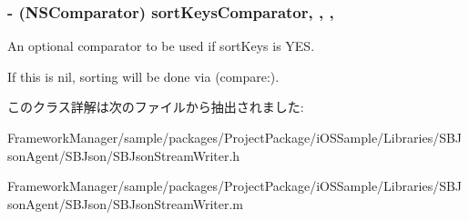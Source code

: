 \subsubsection[{sort\+Keys\+Comparator}]{\setlength{\rightskip}{0pt plus 5cm}-\/ (N\+S\+Comparator) sort\+Keys\+Comparator\hspace{0.3cm}{\ttfamily [read]}, {\ttfamily [write]}, {\ttfamily [atomic]}, {\ttfamily [copy]}}\label{interface_s_b_json_stream_writer_a4a23ef91623a82c08a1597937b7c4f3b}


An optional comparator to be used if sort\+Keys is Y\+E\+S. 

If this is nil, sorting will be done via (compare\+:). 

このクラス詳解は次のファイルから抽出されました\+:\begin{DoxyCompactItemize}
\item 
Framework\+Manager/sample/packages/\+Project\+Package/i\+O\+S\+Sample/\+Libraries/\+S\+B\+Json\+Agent/\+S\+B\+Json/S\+B\+Json\+Stream\+Writer.\+h\item 
Framework\+Manager/sample/packages/\+Project\+Package/i\+O\+S\+Sample/\+Libraries/\+S\+B\+Json\+Agent/\+S\+B\+Json/S\+B\+Json\+Stream\+Writer.\+m\end{DoxyCompactItemize}
